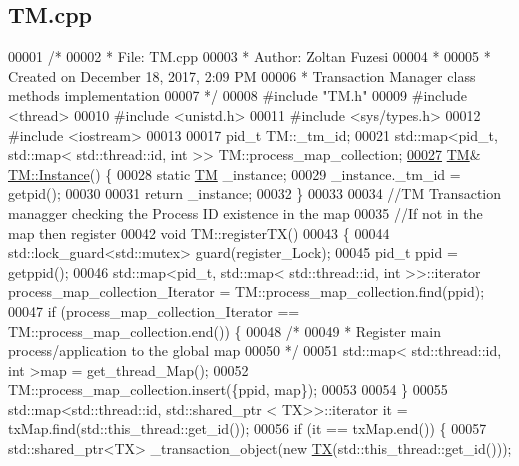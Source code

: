 \hypertarget{_t_m_8cpp_source}{}\subsection{T\+M.\+cpp}

\begin{DoxyCode}
00001 \textcolor{comment}{/* }
00002 \textcolor{comment}{ * File:   TM.cpp}
00003 \textcolor{comment}{ * Author: Zoltan Fuzesi}
00004 \textcolor{comment}{ * }
00005 \textcolor{comment}{ * Created on December 18, 2017, 2:09 PM}
00006 \textcolor{comment}{ * Transaction Manager class methods implementation}
00007 \textcolor{comment}{ */}
00008 \textcolor{preprocessor}{#include "TM.h"}
00009 \textcolor{preprocessor}{#include <thread>}
00010 \textcolor{preprocessor}{#include <unistd.h>}
00011 \textcolor{preprocessor}{#include <sys/types.h>}
00012 \textcolor{preprocessor}{#include <iostream>}
00013 
00017 pid\_t TM::\_tm\_id;
00021 std::map<pid\_t, std::map< std::thread::id, int >> TM::process\_map\_collection;
\hypertarget{_t_m_8cpp_source.tex_l00027}{}\hyperlink{class_t_m_a7ce5f35e0dae76df4fe116cf905bbe60}{00027} \hyperlink{class_t_m}{TM}& \hyperlink{class_t_m_a7ce5f35e0dae76df4fe116cf905bbe60}{TM::Instance}() \{
00028     \textcolor{keyword}{static} \hyperlink{class_t_m}{TM} \_instance;
00029     \_instance.\_tm\_id = getpid();
00030 
00031     \textcolor{keywordflow}{return} \_instance;
00032 \}
00033 
00034 \textcolor{comment}{//TM Transaction managger checking the Process ID existence in the map}
00035 \textcolor{comment}{//If not in the map then register}
00042 \textcolor{comment}{}\textcolor{keywordtype}{void} TM::registerTX()
00043 \{
00044     std::lock\_guard<std::mutex> guard(register\_Lock);
00045     pid\_t ppid = getppid();
00046     std::map<pid\_t, std::map< std::thread::id, int >>::iterator process\_map\_collection\_Iterator = 
      TM::process\_map\_collection.find(ppid);
00047     \textcolor{keywordflow}{if} (process\_map\_collection\_Iterator == TM::process\_map\_collection.end()) \{
00048         \textcolor{comment}{/*}
00049 \textcolor{comment}{         * Register main process/application to the global map}
00050 \textcolor{comment}{         */}
00051         std::map< std::thread::id, int >map = get\_thread\_Map();
00052         TM::process\_map\_collection.insert(\{ppid, map\});
00053 
00054     \}
00055     std::map<std::thread::id, std::shared\_ptr < TX>>::iterator it = txMap.find(std::this\_thread::get\_id());
00056     \textcolor{keywordflow}{if} (it == txMap.end()) \{
00057         std::shared\_ptr<TX> \_transaction\_object(\textcolor{keyword}{new} \hyperlink{class_t_x}{TX}(std::this\_thread::get\_id()));

\end{DoxyCode}
